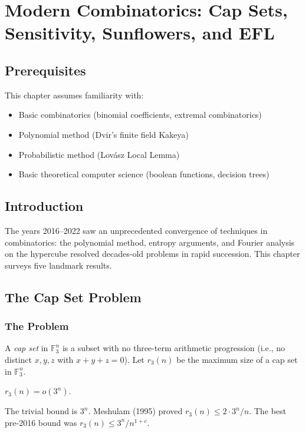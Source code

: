 \let\LocalMacro\relax

\chapter{Modern Combinatorics: Cap Sets, Sensitivity, Sunflowers, and EFL}

\section{Prerequisites}
This chapter assumes familiarity with:
\begin{itemize}
\item Basic combinatorics (binomial coefficients, extremal combinatorics)
\item Polynomial method (Dvir's finite field Kakeya)
\item Probabilistic method (Lovász Local Lemma)
\item Basic theoretical computer science (boolean functions, decision trees)
\end{itemize}

\section{Introduction}
The years 2016--2022 saw an unprecedented convergence of techniques in combinatorics: the polynomial method, entropy arguments, and Fourier analysis on the hypercube resolved decades-old problems in rapid succession. This chapter surveys five landmark results.

\section{The Cap Set Problem}

\subsection{The Problem}
A \emph{cap set} in $\mathbb{F}_3^n$ is a subset with no three-term arithmetic progression (i.e., no distinct $x, y, z$ with $x+y+z=0$). Let $r_3(n)$ be the maximum size of a cap set in $\mathbb{F}_3^n$.

\begin{conjecture}
$r_3(n) = o(3^n)$.
\end{conjecture}

The trivial bound is $3^n$. Meshulam (1995) proved $r_3(n) \le 2 \cdot 3^n / n$. The best pre-2016 bound was $r_3(n) \le 3^n / n^{1+c}$.

